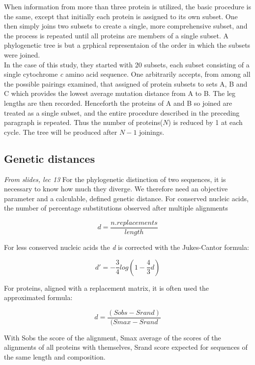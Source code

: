 When information from more than three protein is utilized, the basic procedure is the same, except that initially each protein is assigned to its own subset. One then simply joins two subsets to create a single, more comprehensive subset, and the process is repeated until all proteins are members of  a single subset. 
A phylogenetic tree is but a grphical representaion of the order in which the subsets were joined. 
\\
In the case of this study, they started with 20 subsets, each subset consisting of a single cytochrome \textit{c} amino acid sequence. One arbitrarily accepts, from among all the possible pairings examined, that assigned of protein subsets to sets A, B and C which provides the lowest average mutation distance from A to B. The leg lengths are then recorded. Henceforth the proteins of A and B so joined are treated as a single subset, and the entire procedure described in the preceding paragraph is repeated.  Thus the number of proteins($N$) is reduced by 1 at each cycle. The tree will be produced after $N-1$ joinings. 

\subsection{Genetic distances}
\emph{From slides, lec 13}
For the phylogenetic distinction of two sequences, it is necessary to know how much they diverge. We therefore need an objective parameter and a calculable, defined genetic distance. 
For conserved nucleic acids, the number of percentage substitutions observed after multiple alignments

\begin{equation}
d = \frac{n. replacements}{length}
\end{equation}

For less conserved nucleic acids the \textit{d} is corrected with the Jukes-Cantor formula:

\begin{equation}
d'= -\frac{3}{4}log(1- \frac{4}{3} d)
\end{equation}

For proteins, aligned with a replacement matrix, it is often used the approximated formula:

\begin{equation}
d =  \frac{(Sobs - Srand)}{(Smax -Srand}
\end{equation}

With Sobs the score of the alignment, Smax average of the scores of the alignments of all proteins with themselves, Srand score expected for sequences of the same length and composition. 

